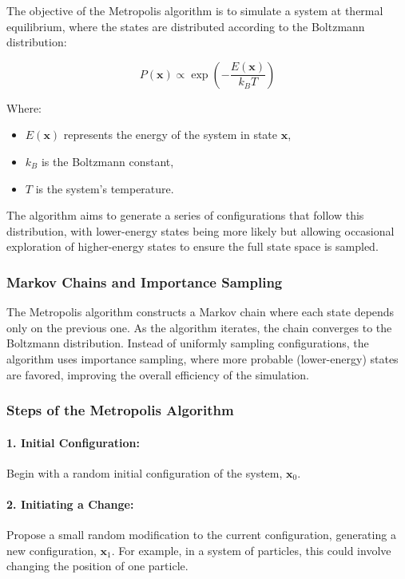 \documentclass[11pt]{article}
\begin{document}
The objective of the Metropolis algorithm is to simulate a system at thermal equilibrium, where the states are distributed according to the Boltzmann distribution:

\[
P(\mathbf{x}) \propto \exp\left( -\frac{E(\mathbf{x})}{k_B T} \right)
\]

Where:
\begin{itemize}
    \item \(E(\mathbf{x})\) represents the energy of the system in state \(\mathbf{x}\),
    \item \(k_B\) is the Boltzmann constant,
    \item \(T\) is the system's temperature.
\end{itemize}

The algorithm aims to generate a series of configurations that follow this distribution, with lower-energy states being more likely but allowing occasional exploration of higher-energy states to ensure the full state space is sampled.

\subsubsection*{Markov Chains and Importance Sampling}

The Metropolis algorithm constructs a Markov chain where each state depends only on the previous one. As the algorithm iterates, the chain converges to the Boltzmann distribution. Instead of uniformly sampling configurations, the algorithm uses importance sampling, where more probable (lower-energy) states are favored, improving the overall efficiency of the simulation.

\subsubsection*{Steps of the Metropolis Algorithm}

\paragraph*{1. Initial Configuration:}  
Begin with a random initial configuration of the system, \(\mathbf{x}_0\).

\paragraph*{2. Initiating a Change:}  
Propose a small random modification to the current configuration, generating a new configuration, \(\mathbf{x}_1\). For example, in a system of particles, this could involve changing the position of one particle.
\end{document}
